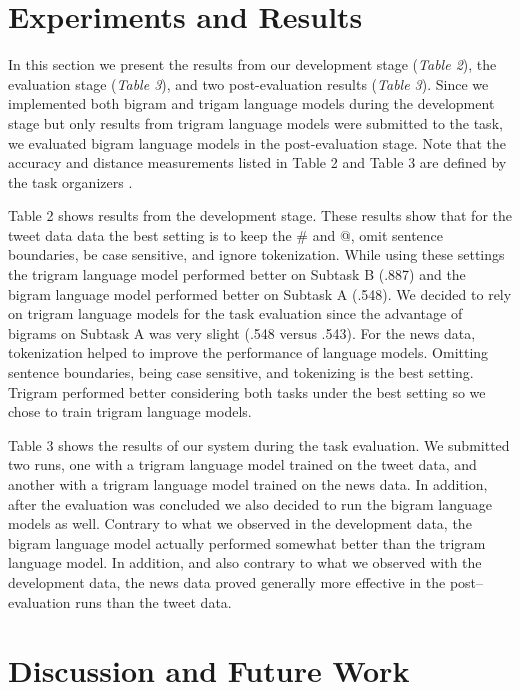 \documentclass[11pt,a4paper]{article}
\begin{document}
\section{Experiments and Results}

In this section we present the results from our development stage (\textit{Table 2}), 
the evaluation stage (\textit{Table 3}), and two post-evaluation results 
(\textit{Table 3}). Since we implemented both bigram and trigam language models during the 
development stage but only results from trigram language models were submitted to the task, 
we evaluated bigram language models in the post-evaluation stage. Note that the accuracy and 
distance measurements listed in Table 2 and Table 3 are defined by the task organizers 
\cite{PotashRR17}. 

Table 2 shows results from the development stage. These results show 
that for the tweet data data the best setting is to keep 
the \# and @, omit sentence boundaries, be case sensitive, and ignore 
tokenization. While using these settings the trigram language model
performed better on Subtask B (.887) and the bigram 
language model performed better on Subtask A (.548). We decided to rely
on trigram language models for the task evaluation since the advantage
of bigrams on Subtask A was very slight (.548 versus .543). 
For the news data, tokenization helped to improve the performance of 
language models. Omitting sentence boundaries, being case sensitive,  
and tokenizing is the best setting. 
Trigram performed better considering both 
tasks under the best setting so we chose to train trigram language  models.

Table 3 shows the results of our system during the task evaluation. We submitted
two runs, one with a trigram language model trained on the tweet data, and another
with a trigram language model trained on the news data. In addition, after
the evaluation was concluded we also decided to run the bigram language models as well.
Contrary to what we observed in the development data, the bigram language 
model actually performed somewhat better than the trigram
language model. In addition, and also contrary to what we observed with the
development data, the news data proved generally more effective in the
post--evaluation runs than the tweet data. 

\section{Discussion and Future Work}
\end{document}
